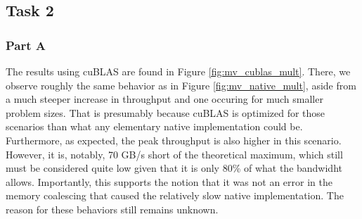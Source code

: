\documentclass[9pt]{article}
\begin{document}
\subsection{Task 2}
\subsubsection{Part A}
The results using cuBLAS are found in Figure \ref{fig:mv_cublas_mult}. There, we observe roughly the same behavior as in Figure \ref{fig:mv_native_mult}, aside from a much steeper increase in throughput and one occuring for much smaller problem sizes. That is presumably because cuBLAS is optimized for those scenarios than what any elementary native implementation could be. Furthermore, as expected, the peak throughput is also higher in this scenario. However, it is, notably, 70 GB/s short of the theoretical maximum, which still must be considered quite low given that it is only 80\% of what the bandwidht allows. Importantly, this supports the notion that it was not an error in the memory coalescing that caused the relatively slow native implementation. The reason for these behaviors still remains unknown. 
\end{document}
